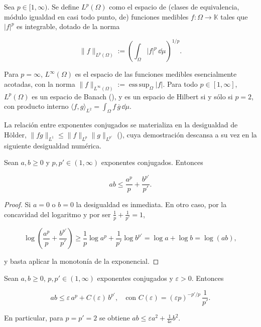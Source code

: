 \begin{Definicion}[Espacio $L^p$]
\label{ch:preliminares:def:Lp}

Sea $p \in [1, \infty)$. Se define $L^p(\Omega)$ como el espacio de (clases de
equivalencia, módulo igualdad en casi todo punto, de) funciones medibles
$f : \Omega \rightarrow \mathbb{K}$ tales que $|f|^p$ es integrable, dotado de la
norma

\[\lVert f \rVert_{L^p(\Omega)} := \left( \int_\Omega |f|^p \, \dd \mu \right)^{1/p}.\]

Para $p = \infty$, $L^\infty(\Omega)$ es el espacio de las funciones medibles
esencialmente acotadas, con la norma
$\lVert f \rVert_{L^\infty(\Omega)} := \operatorname{ess\,sup}_{\Omega} |f|$. Para
todo $p \in [1, \infty]$, $L^p(\Omega)$ es un espacio de Banach
(\cite[Teorema~4.8]{brezis-2011-fun-ana-sob}), y es un espacio de Hilbert si y
sólo si $p = 2$, con producto interno
$\langle f, g \rangle_{L^2} = \int_\Omega f \, \overline{g} \, \dd \mu$.
\end{Definicion}

La relación entre exponentes conjugados se materializa en la desigualdad de
Hölder, $\lVert fg \rVert_{L^1} \leq \lVert f \rVert_{L^p} \lVert g \rVert_{L^{p'}}$
(\cite[Teorema~4.6]{brezis-2011-fun-ana-sob}), cuya demostración descansa a su vez
en la siguiente desigualdad numérica.\\

\begin{Proposicion}
\label{ch:preliminares:prop:young}

Sean $a, b \geq 0$ y $p, p' \in (1, \infty)$ exponentes conjugados. Entonces

\[ab \leq \frac{a^p}{p} + \frac{b^{p'}}{p'}.\]
\end{Proposicion}

\begin{proof}
Si $a = 0$ o $b = 0$ la desigualdad es inmediata. En otro caso, por la concavidad
del logaritmo y por ser $\tfrac{1}{p} + \tfrac{1}{p'} = 1$,

\[\log\!\left( \frac{a^p}{p} + \frac{b^{p'}}{p'} \right) \geq \frac{1}{p}\log a^p + \frac{1}{p'}\log b^{p'} = \log a + \log b = \log(ab),\]

y basta aplicar la monotonía de la exponencial.
\end{proof}

\begin{Proposicion}
\label{ch:preliminares:prop:youngGen}

Sean $a, b \geq 0$, $p, p' \in (1, \infty)$ exponentes conjugados y
$\varepsilon > 0$. Entonces

\[ab \leq \varepsilon \, a^p + C(\varepsilon) \, b^{p'}, \quad \text{con } C(\varepsilon) = (\varepsilon p)^{-p'/p} \, \frac{1}{p'}.\]

En particular, para $p = p' = 2$ se obtiene
$ab \leq \varepsilon a^2 + \tfrac{1}{4\varepsilon} b^2$.
\end{Proposicion}

